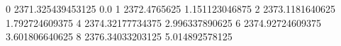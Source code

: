 0 2371.325439453125 0.0
1 2372.4765625 1.151123046875
2 2373.1181640625 1.792724609375
4 2374.32177734375 2.996337890625
6 2374.92724609375 3.601806640625
8 2376.34033203125 5.014892578125
